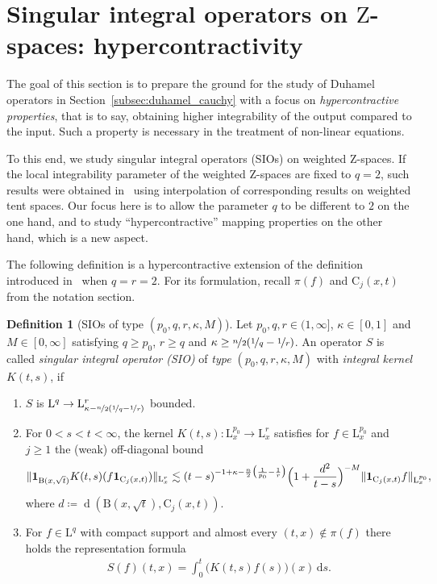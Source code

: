 \documentclass[11pt, leqno]{amsart}
\theoremstyle{definition}
\newtheorem{definition}[theorem]{Definition}
\renewcommand{\L}{\mathrm{L}}
\newcommand{\Z}{\mathrm{Z}}
\newcommand{\ann}{\mathrm{C}}
\renewcommand{\d}{\,\mathrm{d}}
\newcommand{\B}{\mathrm{B}}
\newcommand{\ind}{\mathbf{1}}
\DeclareMathOperator{\dist}{d}
\begin{document}
	\section{Singular integral operators on $\Z$-spaces: hypercontractivity}
	\label{subsec:SIO}

	The goal of this section is to prepare the ground for the study of Duhamel operators in Section~\ref{subsec:duhamel_cauchy} with a focus on \emph{hypercontractive properties}, that is to say, obtaining higher integrability of the output compared to the input.
	Such a property is necessary in the treatment of non-linear equations.

	To this end, we study singular integral operators (SIOs) on weighted $\Z$-spaces. If the local integrability parameter of the weighted $\Z$-spaces are fixed to $q = 2$, such results were obtained in~\cite[Sec.~9]{AH3} using interpolation of corresponding results on weighted tent spaces. Our focus here is to allow the parameter $q$ to be different to $2$ on the one hand, and to study \enquote{hypercontractive} mapping properties on the other hand, which is a new aspect.

	The following definition is a hypercontractive extension of the definition introduced in~\cite{AH2} when $q=r=2$. For its formulation, recall $\pi(f)$ and $\ann_j(x,t)$ from the notation section.

	\begin{definition}[SIOs of type $(p_0,q,r,\kappa,M)$]
		\label{def:SIO}
		Let $p_0,q,r \in (1,\infty]$, $\kappa \in [0,1]$ and $M \in [0,\infty]$ satisfying $q \geq p_0$, $r \geq q$ and $\kappa \geq \nicefrac{n}{2}(\nicefrac{1}{q} - \nicefrac{1}{r})$.
		An operator $S$ is called \emph{singular integral operator (SIO)} of \emph{type $(p_0,q,r,\kappa,M)$} with \emph{integral kernel} $K(t,s)$, if
		\begin{enumerate}
			\item[(a)] $S$ is $\L^q \to \L^r_{\kappa - \nicefrac{n}{2}(\nicefrac{1}{q} - \nicefrac{1}{r})}$ bounded.
			\item[(b)] For $0 < s < t < \infty$, the kernel $K(t,s) \colon \L^{p_0}_x \to \L^r_x$ satisfies for $f\in \L^{p_0}_x$ and $j \geq 1$ the (weak) off-diagonal bound
			\begin{align}
				\| \ind_{\B(x,\sqrt{t})} K(t,s) (f \ind_{\ann_j(x,t)}) \|_{\L^r_x} \lesssim (t-s)^{-1 + \kappa - \frac{n}{2}\bigl( \frac{1}{p_0} - \frac{1}{r} \bigr)} \Bigl( 1 + \frac{d^2}{t-s} \Bigr)^{-M} \| \ind_{\ann_j(x,t)} f \|_{\L^{p_0}_x},
			\end{align}
			where $d \coloneqq \dist(\B(x,\sqrt{t}), \ann_j(x,t))$.
			\item[(c)] For $f \in \L^q$ with compact support and almost every $(t,x) \not\in \pi(f)$ there holds the representation formula
			\begin{align}
				S(f)(t,x) = \int_0^t \bigl(K(t,s) f(s) \bigr)(x) \d s.
			\end{align}
		\end{enumerate}
	\end{definition}
\end{document}
